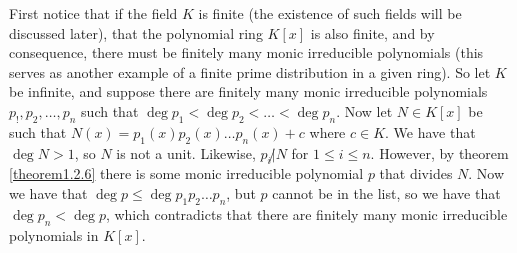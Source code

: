 First notice that if the field $K$ is finite (the existence of such fields will be discussed later), that the polynomial ring $K[x]$ is also finite, and by consequence, there must be finitely many monic irreducible polynomials (this serves as another example of a finite prime distribution in a given ring). So let $K$ be infinite, and suppose there are finitely many monic irreducible polynomials $p_!,p_2, \dots, p_n$ such that $\deg{p_1}<\deg{p_2}< \dots <\deg{p_n}$. Now let $N \in K[x]$ be such that $N(x)=p_1(x)p_2(x) \dots p_n(x)+c$ where $c \in K$. We have that $\deg{N}>1$, so $N$ is not a unit. Likewise, $p_i \not| N$ for $1 \leq i \leq n$. However, by theorem \ref{theorem1.2.6} there is some monic irreducible polynomial $p$ that divides $N$. Now we have that $\deg{p} \leq \deg{p_1p_2 \dots p_n}$, but $p$ cannot be in the list, so we have that $\deg{p_n} < \deg{p}$, which contradicts that there are finitely many monic irreducible polynomials in $K[x]$.